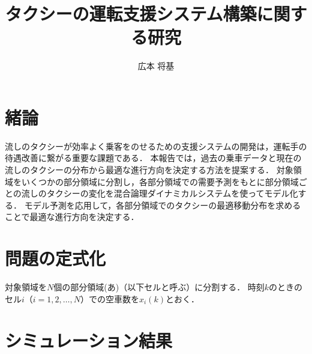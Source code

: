 \documentclass[a4j,10pt,twocolumn]{paper}
\title{タクシーの運転支援システム構築に関する研究}	%
\author{広本 将基}		%
\begin{document}
\absttitle		%

\section{緒論}
流しのタクシーが効率よく乗客をのせるための支援システムの開発は，運転手の待遇改善に繋がる重要な課題である．
本報告では，過去の乗車データと現在の流しのタクシーの分布から最適な進行方向を決定する方法を提案する．
対象領域をいくつかの部分領域に分割し，各部分領域での需要予測をもとに部分領域ごとの流しのタクシーの変化を混合論理ダイナミカルシステムを使ってモデル化する．
モデル予測を応用して，各部分領域でのタクシーの最適移動分布を求めることで最適な進行方向を決定する．
\section{問題の定式化}
対象領域を$N$個の部分領域(あ)（以下セルと呼ぶ）に分割する．
時刻$k$のときのセル$i$（$i = 1, 2, \ldots, N$）での空車数を$x_i(k)$とおく．
\section{シミュレーション結果}

%
%
\begin{thebibliography}{1}
\bibitem{}
\end{thebibliography}
\newpage
\pagebreak
\end{document}
